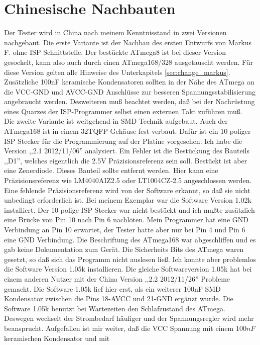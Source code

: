\section{Chinesische Nachbauten}
Der Tester wird in China nach meinem Kenntnisstand in zwei Versionen nachgebaut.
Die erste Variante ist der Nachbau des ersten Entwurfs von Markus F. ohne ISP Schnittstelle.
Der bestückte ATmega8 ist bei dieser Version gesockelt, kann also auch durch einen ATmega168/328 ausgetauscht werden.
Für diese Version gelten alle Hinweise des Unterkapitels \ref{sec:change_markus}.
Zusätzliche 100nF keramische Kondensatoren sollten in der Nähe des ATmega an die VCC-GND und
AVCC-GND Anschlüsse zur besseren Spannungsstabilisierung angebraucht werden.
Desweiteren muß beachtet werden, daß bei der Nachrüstung eines Quarzes der ISP-Programmer selbst
einen externen Takt zuführen muß.\\
Die zweite Variante ist weitgehend in SMD Technik aufgebaut. Auch der ATmega168 ist in einem 32TQFP
Gehäuse fest verbaut.
Dafür ist ein 10 poliger ISP Stecker für die Programmierung auf der Platine vorgesehen.
Ich habe die Version ,,2.1 2012/11/06'' analysiert. Ein Fehler ist die Bestückung des Bauteils ,,D1'',
welches eigentlich die 2.5V Präzisionsreferenz sein soll. Bestückt ist aber eine Zenerdiode.
Dieses Bauteil sollte entfernt werden. Hier kann eine Präzisionsreferenz wie LM4040AIZ2.5 oder
LT1004CZ-2.5 angeschlossen werden. Eine fehlende Präzisionsreferenz wird von der Software erkannt,
so daß sie nicht unbedingt erforderlich ist.
Bei meinem Exemplar war die Software Version 1.02k installiert. Der 10 polige ISP Stecker war nicht
bestückt und ich mußte zusätzlich eine Brücke von Pin 10 nach Pin 6 nachlöten. Mein Programmer hat eine GND
Verbindung an Pin 10 erwartet, der Tester hatte aber nur bei Pin 4 und Pin 6 eine GND Verbindung.
Die Beschriftung des ATmega168 war abgeschliffen und es gab keine Dokumentation zum Gerät.
Die Sicherheits Bits des ATmega waren gesetzt, so daß sich das Programm nicht auslesen ließ.
Ich konnte aber problemlos die Software Version 1.05k installieren.
Die gleiche Softwareversion 1.05k hat bei einem anderen Nutzer mit der China Version ,,2.2 2012/11/26'' Probleme
gemacht. Die Software 1.05k lief hier erst, als ein weiterer 100nF SMD Kondensator zwischen die Pins 18-AVCC
und 21-GND ergänzt wurde. Die Software 1.05k benutzt bei Wartezeiten den Schlafzustand des ATmega.
Deswegen wechselt der Strombedarf häufiger und der Spannungsregler wird mehr beansprucht.
Aufgefallen ist mir weiter, daß die VCC Spannung mit einem \(100nF\) keramischen Kondensator und mit
